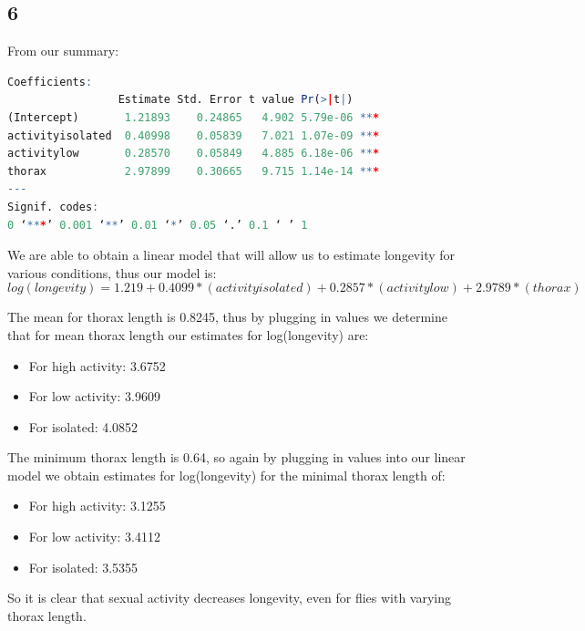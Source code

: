 \documentclass{article}
\begin{document}
    \subsection*{6}
    From our summary:
        \begin{lstlisting}[language=R]
Coefficients:
                 Estimate Std. Error t value Pr(>|t|)    
(Intercept)       1.21893    0.24865   4.902 5.79e-06 ***
activityisolated  0.40998    0.05839   7.021 1.07e-09 ***
activitylow       0.28570    0.05849   4.885 6.18e-06 ***
thorax            2.97899    0.30665   9.715 1.14e-14 ***
---
Signif. codes:  
0 ‘***’ 0.001 ‘**’ 0.01 ‘*’ 0.05 ‘.’ 0.1 ‘ ’ 1 
      \end{lstlisting}
      We are able to obtain a linear model that will allow us to estimate longevity for various conditions, thus our model is:
      \[
      log(longevity) = 1.219 + 0.4099*(activity isolated) + 0.2857*(activity low) +2.9789*(thorax)
      \]

The mean for thorax length is 0.8245, thus by plugging in values we determine that for mean thorax length our estimates for log(longevity) are:
\begin{itemize}
\item For high activity: 3.6752
\item For low activity: 3.9609
\item For isolated: 4.0852
\end{itemize}

The minimum thorax length is 0.64, so again by plugging in values into our linear model we obtain estimates for log(longevity) for the minimal thorax length of:
\begin{itemize}
\item For high activity: 3.1255
\item For low activity: 3.4112
\item For isolated: 3.5355
\end{itemize}

So it is clear that sexual activity decreases longevity, even for flies with varying thorax length.
\end{document}
